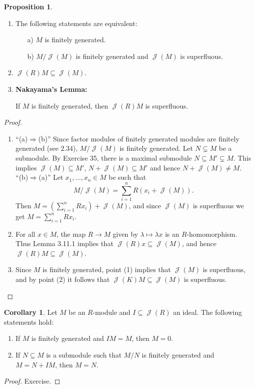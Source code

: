 \documentclass[12pt,a4paper]{report}
\theoremstyle{definition}
\newtheorem{corollary}[theorem]{Corollary} %
\newtheorem{proposition}[theorem]{Proposition}
\theoremstyle{num.custom-title}
\DeclareMathOperator{\J}{\mathcal{J}}
\DeclareMathOperator{\imp}{\Rightarrow}
\DeclareMathOperator{\sse}{\subseteq}
\begin{document}
\begin{proposition}\ 
\begin{enumerate} 
\item The following statements are equivalent:
\begin{itemize}
\item[a)] $M$ is finitely generated.
\item[b)] $M/\J(M)$ is finitely generated and $\J(M)$ is superfluous.
\end{itemize}
\item $\J(R)M \sse \J(M)$.
\item \textbf{Nakayama's Lemma:}
\begin{center}
If $M$ is finitely generated, then $\J(R)M$ is superfluous.
\end{center}
\end{enumerate}
\begin{proof}\ 
\begin{enumerate}
\item ``(a)$\imp$(b)'' Since factor modules of finitely generated modules are finitely generated (see 2.34), $M/\J(M)$ is finitely generated. Let $N \subsetneq M$ be a submodule. By Exercise 35, there is a maximal submodule $N \sse M' \subsetneq M$. This implies $\J(M) \sse M'$, $N + \J(M) \sse M'$ and hence $N + \J(M) \neq M$.\\
``(b)$\imp$(a)'' Let $x_1,...,x_n \in M$ be such that
\[
M/\J(M) = \sum_{i=1}^n R(x_i + \J(M)).
\]
Then $M = (\sum_{i=1}^n R x_i) + \J(M)$, and since $\J(M)$ is superfluous we get $M = \sum_{i=1}^n R x_i$.
\item For all $x \in M$, the map $R \to M$ given by $\lambda \mapsto \lambda x$ is an $R$-homomorphism. Thus Lemma 3.11.1 implies that $\J(R) x \sse \J(M)$, and hence $\J(R)M \sse \J(M)$.
\item Since $M$ is finitely generated, point (1) implies that $\J(M)$ is superfluous, and by point (2) it follows that $\J(K)M \sse \J(M)$ is superfluous.
\end{enumerate}
\end{proof}
\end{proposition}

\begin{corollary}
Let $M$ be an $R$-module and $I \sse \J(R)$ an ideal. The following statements hold:
\begin{enumerate}
\item If $M$ is finitely generated and $IM=M$, then $M=0$.
\item If $N \sse M$ is a submodule such that $M/N$ is finitely generated and $M=N+IM$, then $M=N$.
\end{enumerate}
\begin{proof}
Exercise.
\end{proof}
\end{corollary}
\end{document}
